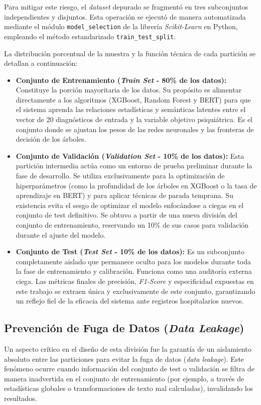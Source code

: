 \documentclass[12pt,a4paper,onecolumn,oneside]{report}
\begin{document}
Para mitigar este riesgo, el \textit{dataset} depurado se fragmentó en tres subconjuntos independientes y disjuntos. Esta operación se ejecutó de manera automatizada mediante el módulo \texttt{model\_selection} de la librería \textit{Scikit-Learn} en Python, empleando el método estandarizado \texttt{train\_test\_split}. 

La distribución porcentual de la muestra y la función técnica de cada partición se detallan a continuación:

\begin{itemize}
    \item \textbf{Conjunto de Entrenamiento (\textit{Train Set} - 80\% de los datos):} Constituye la porción mayoritaria de los datos. Su propósito es alimentar directamente a los algoritmos (XGBoost, Random Forest y BERT) para que el sistema aprenda las relaciones estadísticas y semánticas latentes entre el vector de 20 diagnósticos de entrada y la variable objetivo psiquiátrica. Es el conjunto donde se ajustan los pesos de las redes neuronales y las fronteras de decisión de los árboles.
    
    \item \textbf{Conjunto de Validación (\textit{Validation Set} - 10\% de los datos):} Esta partición intermedia actúa como un entorno de prueba preliminar durante la fase de desarrollo. Se utiliza exclusivamente para la optimización de hiperparámetros (como la profundidad de los árboles en XGBoost o la tasa de aprendizaje en BERT) y para aplicar técnicas de parada temprana. Su existencia evita el sesgo de optimizar el modelo enfocándose a ciegas en el conjunto de test definitivo. Se obtuvo a partir de una nueva división del conjunto de entrenamiento, reservando un 10\% de sus casos para validación durante el ajuste del modelo.
    
    \item \textbf{Conjunto de Test (\textit{Test Set} - 10\% de los datos):} Es un subconjunto completamente aislado que permanece oculto para los modelos durante toda la fase de entrenamiento y calibración. Funciona como una auditoría externa ciega. Las métricas finales de precisión, \textit{F1-Score} y especificidad expuestas en este trabajo se extraen única y exclusivamente de este conjunto, garantizando un reflejo fiel de la eficacia del sistema ante registros hospitalarios nuevos.
\end{itemize}

\subsection{Prevención de Fuga de Datos (\textit{Data Leakage})}
Un aspecto crítico en el diseño de esta división fue la garantía de un aislamiento absoluto entre las particiones para evitar la fuga de datos (\textit{data leakage}). Este fenómeno ocurre cuando información del conjunto de test o validación se filtra de manera inadvertida en el conjunto de entrenamiento (por ejemplo, a través de estadísticas globales o transformaciones de texto mal calculadas), invalidando los resultados. 
\end{document}
